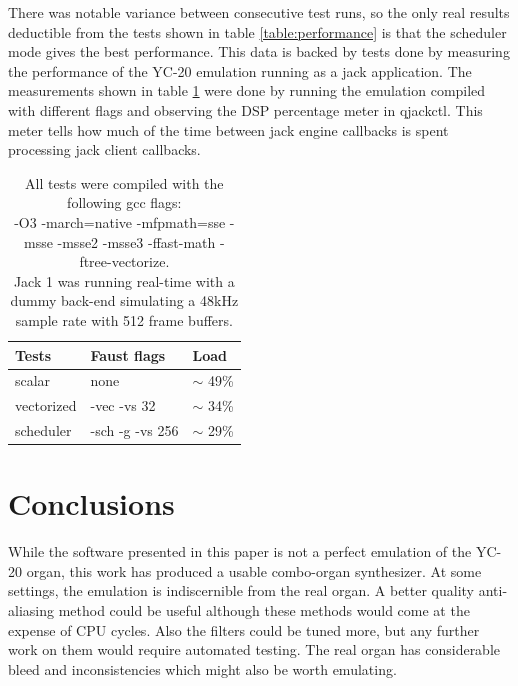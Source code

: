 \documentclass[11pt,a4paper]{article}
\begin{document}
There was notable variance between consecutive test runs, so the only real results deductible from the tests shown in table \ref{table:performance} is that the scheduler mode gives the best performance. This data is backed by tests done by measuring the performance of the YC-20 emulation running as a jack application. The measurements shown in table \ref{table:performance2} were done by running the emulation compiled with different flags and observing the DSP percentage meter in qjackctl. This meter tells how much of the time between jack engine callbacks is spent processing jack client callbacks.

\begin{table}[h]
 \begin{center}
\begin{tabular}{|l|l|l|}

      \hline
      Tests         & Faust flags & Load   \\
      \hline\hline
      scalar        & none & $\sim$ 49\% \\
      vectorized    & -vec -vs 32 & $\sim$ 34\% \\
      scheduler     & -sch -g -vs 256 & $\sim$ 29\% \\
      \hline

\end{tabular}
\caption{All tests were compiled with the following gcc flags: \\
-O3 -march=native -mfpmath=sse -msse -msse2 -msse3 -ffast-math -ftree-vectorize. \\
Jack 1 was running real-time with a dummy back-end simulating a 48kHz sample rate with 512 frame buffers.
}\label{table:performance2}
 \end{center}
\end{table}



\section{Conclusions}

While the software presented in this paper is not a perfect emulation of the YC-20 organ, this work has produced a usable combo-organ synthesizer. At some settings, the emulation is indiscernible from the real organ. A better quality anti-aliasing method could be useful although these methods would come at the expense of CPU cycles. Also the filters could be tuned more, but any further work on them would require automated testing. The real organ has considerable bleed and inconsistencies which might also be worth emulating.
\end{document}

